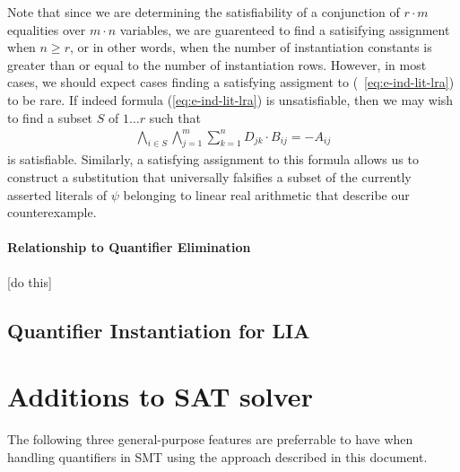 \documentclass{llncs}
\newtheorem{thm}{Theorem}
\begin{document}


Note that since we are determining the satisfiability of a conjunction of $r \cdot m$ equalities over $m \cdot n$ variables, we are guarenteed to find a satisifying assignment when $n \geq r$, or in other words, when the number of instantiation constants is greater than or equal to the number of instantiation rows.
However, in most cases, we should expect cases finding a satisfying assigment to (~\ref{eq:e-ind-lit-lra}) to be rare.
If indeed formula (\ref{eq:e-ind-lit-lra}) is unsatisfiable, then we may wish to find a subset $S$ of $1 \ldots r$ such that 
\begin{eqnarray}
\displaystyle\bigwedge\limits_{i \in S} \displaystyle\bigwedge\limits_{j=1}^m \displaystyle\sum\limits_{k=1}^n D_{jk} \cdot B_{ij} = -A_{ij}
\end{eqnarray}
is satisfiable.  
Similarly, a satisfying assignment to this formula allows us to construct a substitution that universally falsifies a subset of the currently asserted literals of $\psi$ belonging to linear real arithmetic that describe our counterexample.

\paragraph{Relationship to Quantifier Elimination}

[do this]

\subsection{Quantifier Instantiation for LIA}


\section{Additions to SAT solver}
\label{sec:sat-add}

The following three general-purpose features are preferrable to have when handling quantifiers in SMT using the approach described in this document.
\end{document}
